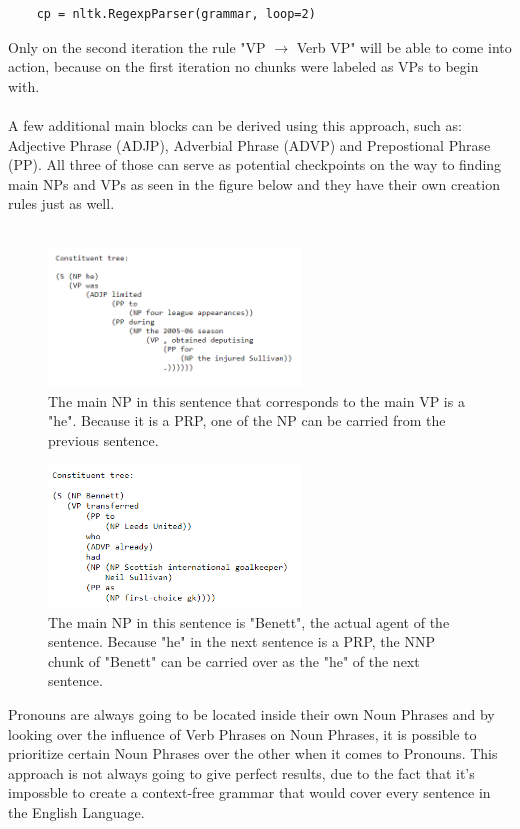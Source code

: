 \documentclass{article}
\begin{document}
\begin{verbatim}
    cp = nltk.RegexpParser(grammar, loop=2)
\end{verbatim}
Only on the second iteration the rule "VP $\rightarrow$ Verb VP" will be able to come into action, because on the first iteration no chunks were labeled as VPs to begin with. \\ \\
A few additional main blocks can be derived using this approach, such as: Adjective Phrase (ADJP), Adverbial Phrase (ADVP) and Prepostional Phrase (PP)\cite{CFG for PP etc.}. All three of those can serve as potential checkpoints on the way to finding main NPs and VPs as seen in the figure below and they have their own creation rules just as well. \\ \\
\begin{figure}[h]
    \centering
\includegraphics[width=0.6\textwidth]{NPsvsVPs.png}
    \caption{The main NP in this sentence that corresponds to the main VP is a "he". Because it is a PRP, one of the NP can be carried from the previous sentence.}
\end{figure}
\begin{figure}[H]
    \centering
\includegraphics[width=0.6\textwidth]{NPsvsVPs2.png}
    \caption{The main NP in this sentence is "Benett", the actual agent of the sentence. Because "he" in the next sentence is a PRP, the NNP chunk of "Benett" can be carried over as the "he" of the next sentence.}
\end{figure}
\noindent Pronouns are always going to be located inside their own Noun Phrases and by looking over the influence of Verb Phrases on Noun Phrases, it is possible to prioritize certain Noun Phrases over the other when it comes to Pronouns. This approach is not always going to give perfect results, due to the fact that it's impossble to create a context-free grammar that would cover every sentence in the English Language. \\ \\
\end{document}
